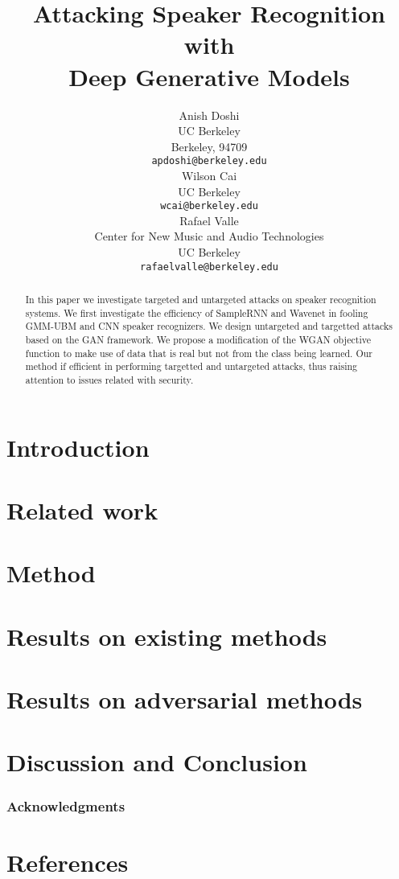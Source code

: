 \documentclass{article}
\title{Attacking Speaker Recognition with \\Deep Generative Models}
\author{
  Anish Doshi \\
  UC Berkeley \\
  Berkeley, 94709 \\
  \texttt{apdoshi@berkeley.edu} \\
  \And
  Wilson Cai\\
  UC Berkeley\\
  \texttt{wcai@berkeley.edu} \\
  \And
  Rafael Valle \\
  Center for New Music and Audio Technologies \\
  UC Berkeley\\
  \texttt{rafaelvalle@berkeley.edu} \\
}
\begin{document}

\maketitle

\begin{abstract}
    In this paper we investigate targeted and untargeted attacks on speaker
    recognition systems. We first investigate the efficiency of SampleRNN 
    and Wavenet in fooling GMM-UBM and CNN speaker recognizers. We design
    untargeted and targetted attacks based on the GAN framework. We propose  
    a modification of the WGAN objective function to make use of data that is 
    real but not from the class being learned. Our method if efficient in 
    performing targetted and untargeted attacks, thus raising attention to
    issues related with security. 
\end{abstract}

\theoremseparator{:}
\newtheorem{hyp}{Hypothesis}

\section{Introduction} \label{sec:introduction}

%
\section{Related work}\label{sec:related_work}

%
\section{Method}\label{sec:method}

%
\section{Results on existing methods}\label{sec:res_existing}

%
\section{Results on adversarial methods}\label{sec:res_adversarial}

%
\section{Discussion and Conclusion}\label{sec:conclusions}

%

\subsubsection*{Acknowledgments}


\section*{References}


\end{document}
